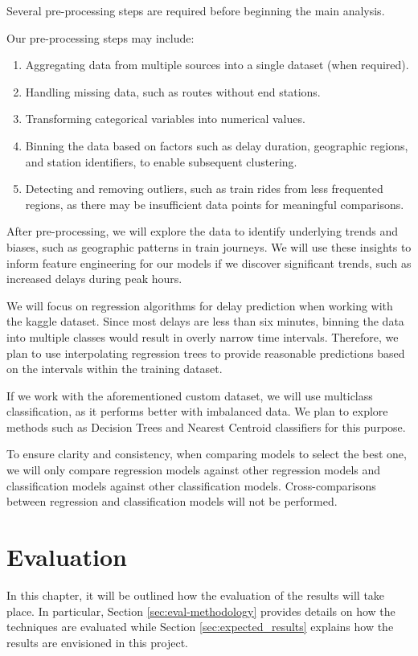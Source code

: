\documentclass[a4paper,oneside,bibliography=totoc]{scrbook}
\begin{document}
Several pre-processing steps are required before beginning the main analysis.

Our pre-processing steps may include:
\begin{enumerate}
    \item Aggregating data from multiple sources into a single dataset (when required).
    \item Handling missing data, such as routes without end stations.
    \item Transforming categorical variables into numerical values.
    \item Binning the data based on factors such as delay duration, geographic regions, and station identifiers,
    to enable subsequent clustering.
    \item Detecting and removing outliers, such as train rides from less frequented regions,
    as there may be insufficient data points for meaningful comparisons.
\end{enumerate}

After pre-processing, we will explore the data to identify underlying trends and biases,
such as geographic patterns in train journeys.
We will use these insights to inform feature engineering for our models if we discover significant trends,
such as increased delays during peak hours.

We will focus on regression algorithms for delay prediction when working with the kaggle dataset.
Since most delays are less than six minutes, binning the data into multiple classes would result in overly narrow time intervals.
Therefore, we plan to use interpolating regression trees to provide reasonable predictions based on the intervals within the training dataset.

If we work with the aforementioned custom dataset, we will use multiclass classification, as it performs better with imbalanced data. %
We plan to explore methods such as Decision Trees and Nearest Centroid classifiers for this purpose.

To ensure clarity and consistency, when comparing models to select the best one,
we will only compare regression models against other regression models and classification models against other classification models.
Cross-comparisons between regression and classification models will not be performed.

\chapter{Evaluation}\label{ch:eval}
In this chapter, it will be outlined how the evaluation of the results will take place.
In particular, Section \ref{sec:eval-methodology} provides details on how the techniques are evaluated while Section \ref{sec:expected_results} explains how the results are envisioned in this project.
\end{document}
